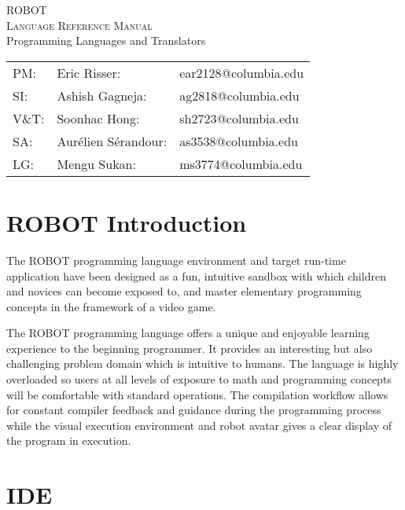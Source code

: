 \documentclass[a4paper]{article}
\begin{document}
\thispagestyle{empty}
\vspace*{9cm}
\begin{center}
	\Huge ROBOT\\
	\textsc{Language Reference Manual}\\
	\normalsize Programming Languages and Translators
\end{center}

\vspace*{9cm}
\begin{tabular}{lll}
PM: & Eric Risser: & ear2128@columbia.edu\\
SI: & Ashish Gagneja: & ag2818@columbia.edu\\
V\&T: & Soonhac Hong: & sh2723@columbia.edu\\
SA: & Aur\'elien S\'erandour: & as3538@columbia.edu\\
LG: & Mengu Sukan: & ms3774@columbia.edu\\
\end{tabular}

\newpage

\tableofcontents

\newpage


\section*{ROBOT Introduction}

The ROBOT programming language environment and target run-time application have been designed as a fun, intuitive sandbox with which children and novices can become exposed to, and master elementary programming concepts in the framework of a video game.

The ROBOT programming language offers a unique and enjoyable learning experience to the beginning programmer. It provides an interesting but also challenging problem domain which is intuitive to humans. The language is highly overloaded so users at all levels of exposure to math and programming concepts will be comfortable with standard operations. The compilation workflow allows for constant compiler feedback and guidance during the programming process while the visual execution environment and robot avatar gives a clear display of the program in execution.

\section{IDE}
\end{document}
